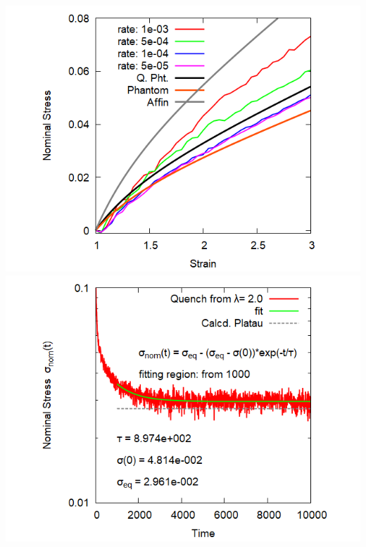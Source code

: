 \documentclass[11pt, dvipdfmx]{beamer}
\begin{document}
\begin{frame}
\begin{columns}[totalwidth=\linewidth]
\includegraphics[width=1.2\columnwidth]{./fig/4_ChainSS_multi.png}
\includegraphics[width=1.2\columnwidth]{./fig/4_Chain_Stress_Quench.png}
\end{columns}

\end{frame}
\end{document}
